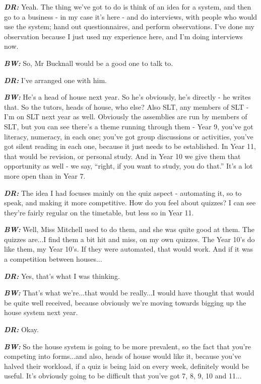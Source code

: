 \textit{\textbf{DR:}} Yeah. The thing we've got to do is think of an idea for a system, and then go to a business - in my case it's here - and do interviews, with people who would use the system; hand out questionnaires, and perform observations. I've done my observation because I just used my experience here, and I'm doing interviews now.

\textit{\textbf{BW:}} So, Mr Bucknall would be a good one to talk to.

\textit{\textbf{DR:}} I've arranged one with him.

\textit{\textbf{BW:}} He's a head of house next year. So he's obviously, he's directly - he writes that. So the tutors, heads of house, who else? Also SLT, any members of SLT - I'm on SLT next year as well. Obviously the assemblies are run by members of SLT, but you can see there's a theme running through them - Year 9, you've got literacy, numeracy, in each one; you've got group discussions or activities, you've got silent reading in each one, because it just needs to be established. In Year 11, that would be revision, or personal study. And in Year 10 we give them that opportunity as well - we say, ``right, if you want to study, you do that.'' It's a lot more open than in Year 7.

\textit{\textbf{DR:}} The idea I had focuses mainly on the quiz aspect - automating it, so to speak, and making it more competitive. How do you feel about quizzes? I can see they're fairly regular on the timetable, but less so in Year 11.

\textit{\textbf{BW:}} Well, Miss Mitchell used to do them, and she was quite good at them. The quizzes are...I find them a bit hit and miss, on my own quizzes. The Year 10's do like them, my Year 10's. If they were automated, that would work. And if it was a competition between houses...

\textit{\textbf{DR:}} Yes, that's what I was thinking.

\textit{\textbf{BW:}} That's what we're...that would be really...I would have thought that would be quite well received, because obviously we're moving towards bigging up the house system next year. 

\textit{\textbf{DR:}} Okay.

\textit{\textbf{BW:}} So the house system is going to be more prevalent, so the fact that you're competing into forms...and also, heads of house would like it, because you've halved their workload, if a quiz is being laid on every week, definitely would be useful. It's obviously going to be difficult that you've got 7, 8, 9, 10 and 11...

